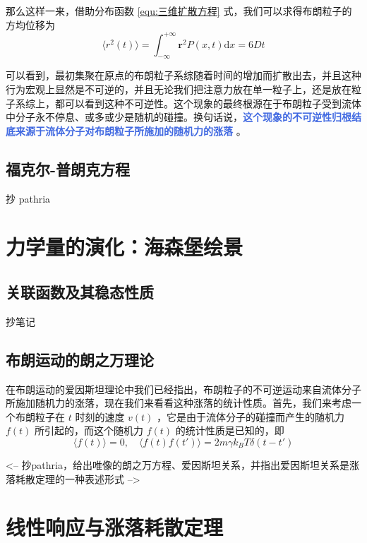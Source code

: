 那么这样一来，借助分布函数 \eqref{equ:三维扩散方程} 式，我们可以求得布朗粒子的方均位移为
\begin{equation}\label{equ:布朗粒子的方均位移}
    \langle r^2(t) \rangle = \int_{-\infty}^{+\infty} \bm r^2 P(x,t)\mathrm{d}x = 6Dt
\end{equation}

可以看到，最初集聚在原点的布朗粒子系综随着时间的增加而扩散出去，并且这种行为宏观上显然是不可逆的，并且无论我们把注意力放在单一粒子上，还是放在粒子系综上，都可以看到这种不可逆性。这个现象的最终根源在于布朗粒子受到流体中分子永不停息、或多或少是随机的碰撞。换句话说，\textcolor{RoyalBlue}{\textbf{\kaishu  这个现象的不可逆性归根结底来源于流体分子对布朗粒子所施加的随机力的涨落}} 。

\subsection{福克尔-普朗克方程}

抄 pathria

\section{力学量的演化：海森堡绘景}\label{sec:力学量的演化：海森堡绘景}


\subsection{关联函数及其稳态性质}

抄笔记

\subsection{布朗运动的朗之万理论}

在布朗运动的爱因斯坦理论中我们已经指出，布朗粒子的不可逆运动来自流体分子所施加随机力的涨落，现在我们来看看这种涨落的统计性质。首先，我们来考虑一个布朗粒子在 $t$ 时刻的速度 $v(t)$ ，它是由于流体分子的碰撞而产生的随机力 $f(t)$ 所引起的，而这个随机力 $f(t)$ 的统计性质是已知的，即
\begin{equation}\label{equ:随机力的统计性质}
    \langle f(t) \rangle = 0, \quad \langle f(t)f(t') \rangle = 2m\gamma k_BT\delta(t-t')
\end{equation}


<-- 抄pathria，给出唯像的朗之万方程、爱因斯坦关系，并指出爱因斯坦关系是涨落耗散定理的一种表述形式 -->

\section{线性响应与涨落耗散定理}\label{sec:线性响应与涨落耗散定理}

